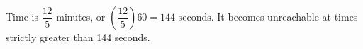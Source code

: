 Time is $\dfrac{12}{5}$ minutes, or $(\dfrac{12}{5})60=\boxed{144\text{ seconds}}$. It becomes unreachable at times strictly greater than 144 seconds.
